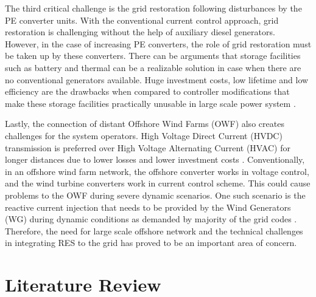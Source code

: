 The third critical challenge is the grid restoration following disturbances by the \gls{PE} converter units. With the conventional current control approach, grid restoration is challenging without the help of auxiliary diesel generators. However, in the case of increasing \gls{PE} converters, the role of grid restoration must be taken up by these converters. There can be arguments that storage facilities such as battery and thermal can be a realizable solution in case when there are no conventional generators available. Huge investment costs, low lifetime and low efficiency are the drawbacks when compared to controller modifications that make these storage facilities practically unusable in large scale power system \cite{telaretti_economic_2016}.  

Lastly, the connection of distant Offshore Wind Farms (\gls{OWF}) also creates challenges for the system operators. High Voltage Direct Current (\gls{HVDC}) transmission is preferred over High Voltage Alternating Current (\gls{HVAC}) for longer distances due to lower losses and lower investment costs \cite{ryndzionek_evolution_2020}. Conventionally, in an offshore wind farm network, the offshore converter works in voltage control, and the wind turbine converters work in current control scheme. This could cause problems to the \gls{OWF} during severe dynamic scenarios. One such scenario is the reactive current injection that needs to be provided by the Wind Generators (\gls{WG}) during dynamic conditions as demanded by majority of the grid codes \cite{mohseni_review_2012}. Therefore, the need for large scale offshore network and the technical challenges in integrating \gls{RES} to the grid has proved to be an important area of concern.

\section{Literature Review}

